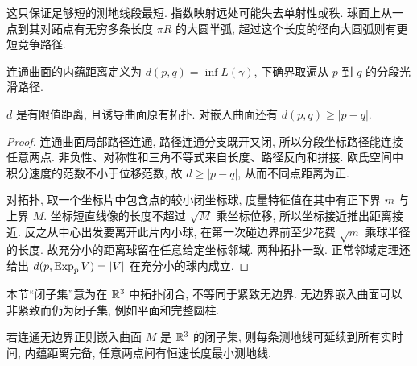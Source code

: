 这只保证足够短的测地线段最短. 指数映射远处可能失去单射性或秩. 球面上从一点到其对跖点有无穷多条长度 $\pi R$ 的大圆半弧, 超过这个长度的径向大圆弧则有更短竞争路径.
\begin{definition}
连通曲面的内蕴距离定义为 $d(p,q)=\inf L(\gamma)$, 下确界取遍从 $p$ 到 $q$ 的分段光滑路径.
\end{definition}
\begin{proposition}\label{prop:distance}
$d$ 是有限值距离, 且诱导曲面原有拓扑. 对嵌入曲面还有 $d(p,q)\ge|p-q|$.
\end{proposition}
\begin{proof}
连通曲面局部路径连通, 路径连通分支既开又闭, 所以分段坐标路径能连接任意两点. 非负性、对称性和三角不等式来自长度、路径反向和拼接. 欧氏空间中积分速度的范数不小于位移范数, 故 $d\ge|p-q|$, 从而不同点距离为正.

对拓扑, 取一个坐标片中包含点的较小闭坐标球, 度量特征值在其中有正下界 $m$ 与上界 $M$. 坐标短直线像的长度不超过 $\sqrt M$ 乘坐标位移, 所以坐标接近推出距离接近. 反之从中心出发要离开此片内小球, 在第一次碰边界前至少花费 $\sqrt m$ 乘球半径的长度. 故充分小的距离球留在任意给定坐标邻域. 两种拓扑一致. 正常邻域定理还给出 $d(p,\operatorname{Exp}_pV)=|V|$ 在充分小的球内成立.
\end{proof}
本节“闭子集”意为在 $\mathbb R^3$ 中拓扑闭合, 不等同于紧致无边界. 无边界嵌入曲面可以非紧致而仍为闭子集, 例如平面和完整圆柱.
\begin{theorem}\label{thm:closed-geodesic}
若连通无边界正则嵌入曲面 $M$ 是 $\mathbb R^3$ 的闭子集, 则每条测地线可延续到所有实时间, 内蕴距离完备, 任意两点间有恒速长度最小测地线.
\end{theorem}

